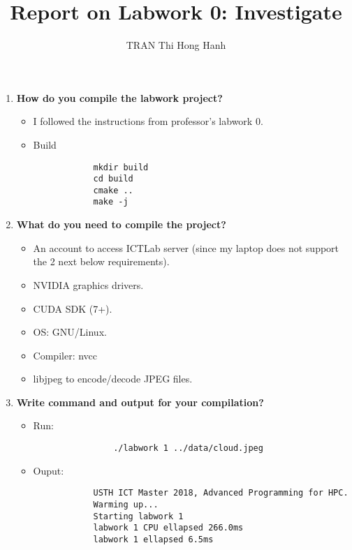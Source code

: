 \documentclass{article}
\title{Report on Labwork 0: Investigate}
\author{TRAN Thi Hong Hanh}
\begin{document}
\maketitle
\begin{enumerate}
    \item \textbf{How do you compile the labwork project?}
    \begin{itemize}
        \item [] I followed the instructions from professor's labwork 0.
        \item Build
        \begin{verbatim}
            mkdir build
            cd build
            cmake ..
            make -j
        \end{verbatim}
    \end{itemize}
    \item \textbf{What do you need to compile the project?}
    \begin{itemize}
        \item An account to access ICTLab server (since my laptop does not support the 2 next below requirements).
        \item NVIDIA graphics drivers.
        \item CUDA SDK (7+).
        \item OS: GNU/Linux.
        \item Compiler: nvcc
        \item libjpeg to encode/decode JPEG files.
    \end{itemize}
    \item \textbf{Write command and output for your compilation?}
        \begin{itemize}
            \item Run:
            \begin{verbatim}
                ./labwork 1 ../data/cloud.jpeg 
            \end{verbatim}
            \item Ouput:
            \begin{verbatim}
            USTH ICT Master 2018, Advanced Programming for HPC.
            Warming up...
            Starting labwork 1
            labwork 1 CPU ellapsed 266.0ms
            labwork 1 ellapsed 6.5ms
            \end{verbatim}
        \end{itemize}
\end{enumerate}
\end{document}
